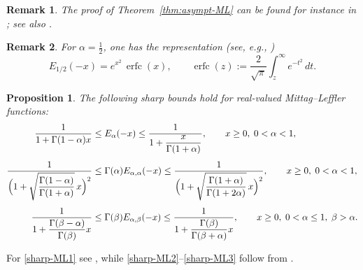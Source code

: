 \documentclass[12pt, reqno]{amsart}
\DeclareMathOperator\erfc{erfc}
\newtheorem{proposition}{Proposition}[section]
\newtheorem{remark}{Remark}[section]
\begin{document}
\begin{remark}
\rm The proof of Theorem~\ref{thm:asympt-ML} can be found for instance in
\cite[Proposition~3.6 and Theorem~4.3]{Gorenflo2020}; see also \cite{FCAA-2002,Exo-Book}.
\end{remark}

\begin{remark}
\rm For $\alpha=\tfrac12$, one has the representation (see, e.g., \cite[p.~107]{Exo-Book})
\[
E_{1/2}(-x)=e^{x^2}\,\erfc(x),
\qquad
\erfc(z):=\frac{2}{\sqrt{\pi}}\int_z^\infty e^{-t^2}\,dt.
\]
\end{remark}

\begin{proposition}\label{prop:sharp-asympt-ML}
The following sharp bounds hold for real-valued Mittag--Leffler functions:
\begin{align}
\label{sharp-ML1}
\frac{1}{1+\Gamma(1-\alpha)x}
&\leq
E_{\alpha}(-x)
\leq
\frac{1}{1+\dfrac{x}{\Gamma(1+\alpha)}},
\qquad x \geq 0,\; 0 < \alpha < 1, \\[1ex]
\label{sharp-ML2}
\frac{1}{\Bigl(1+\sqrt{\dfrac{\Gamma(1-\alpha)}{\Gamma(1+\alpha)}}\,x\Bigr)^2}
&\leq
\Gamma(\alpha)E_{\alpha,\alpha}(-x)
\leq
\frac{1}{\Bigl(1+\sqrt{\dfrac{\Gamma(1+\alpha)}{\Gamma(1+2\alpha)}}\,x\Bigr)^2},
\qquad x \geq 0,\; 0 < \alpha < 1, \\[1ex]
\label{sharp-ML3}
\frac{1}{1+\dfrac{\Gamma(\beta-\alpha)}{\Gamma(\beta)}x}
&\leq
\Gamma(\beta)E_{\alpha,\beta}(-x)
\leq
\frac{1}{1+\dfrac{\Gamma(\beta)}{\Gamma(\beta+\alpha)}x},
\qquad x \geq 0,\; 0 < \alpha \leq 1,\; \beta > \alpha .
\end{align}
\end{proposition}

\noindent
For \eqref{sharp-ML1} see \cite[Theorem~4]{Simon2014}, while \eqref{sharp-ML2}--\eqref{sharp-ML3}
follow from \cite[Proposition~4]{Boudabsa2021}.

\medskip
\end{document}
